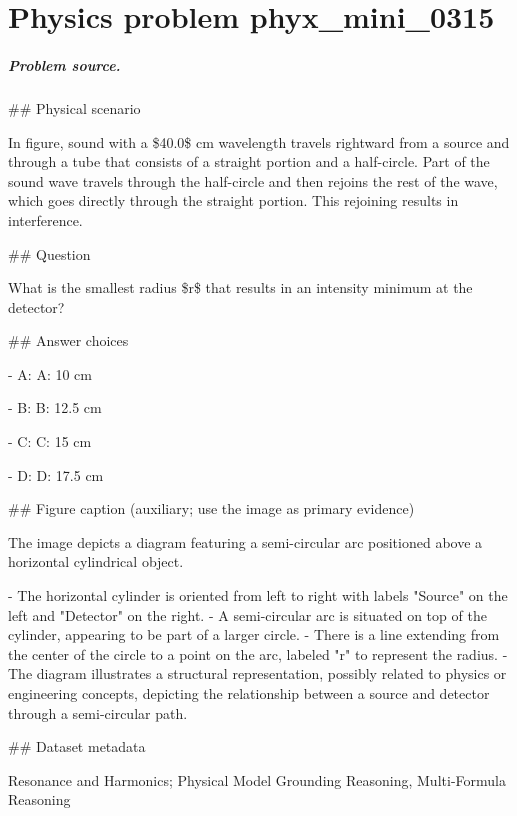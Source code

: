 
\chapter{Physics problem phyx\_mini\_0315}
\label{ch:PhyXMiniProblems_problem_phyx_mini_0315}

\paragraph{Problem source.}
\#\# Physical scenario

In figure, sound with a \$40.0\$ cm wavelength travels rightward from a source and through a tube that consists of a straight portion and a half-circle. Part of the sound wave travels through the half-circle and then rejoins the rest of the wave, which goes directly through the straight portion. This rejoining results in interference.

\#\# Question

What is the smallest radius \$r\$ that results in an intensity minimum at the detector?

\#\# Answer choices

- A: A: 10 cm

- B: B: 12.5 cm

- C: C: 15 cm

- D: D: 17.5 cm

\#\# Figure caption (auxiliary; use the image as primary evidence)

The image depicts a diagram featuring a semi-circular arc positioned above a horizontal cylindrical object. 

- The horizontal cylinder is oriented from left to right with labels "Source" on the left and "Detector" on the right.
- A semi-circular arc is situated on top of the cylinder, appearing to be part of a larger circle.
- There is a line extending from the center of the circle to a point on the arc, labeled "r" to represent the radius.
- The diagram illustrates a structural representation, possibly related to physics or engineering concepts, depicting the relationship between a source and detector through a semi-circular path.

\#\# Dataset metadata

Resonance and Harmonics; Physical Model Grounding Reasoning, Multi-Formula Reasoning

